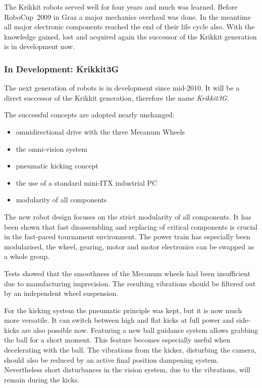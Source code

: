 \documentclass[12pt,a4paper]{article}
\begin{document}
The Krikkit robots served well for four years and much was learned.
Before RoboCup~2009 in Graz a major mechanics overhaul was done.
In the meantime all major electronic components reached the end of their life cycle also.
With the knowledge gained, lost and acquired again the successor of the Krikkit generation is in development now.
    

\subsubsection{In Development: Krikkit3G}

The next generation of robots is in development since mid-2010.
It will be a direct successor of the Krikkit generation, therefore the name \emph{Krikkit3G}.

The successful concepts are adopted nearly unchanged:\nopagebreak[4] %
\begin{itemize}
  \item omnidirectional drive with the three Mecanum Wheels
  \item the omni-vision system
  \item pneumatic kicking concept
  \item the use of a standard mini-ITX industrial PC
  \item modularity of all components
\end{itemize}

The new robot design focuses on the strict modularity of all components.
It has been shown that fast disassembling and replacing of critical components is crucial in the fast-paced tournament environment.
The power train has especially been modularised, the wheel, gearing, motor and motor electronics can be swapped as a whole group.

Tests showed that the smoothness of the Mecanum wheels had been insufficient due to manufacturing imprecision.
The resulting vibrations should be filtered out by an independent wheel suspension.


For the kicking system the pneumatic principle was kept, but it is now much more versatile. 
It can switch between high and flat kicks at full power and side-kicks are also possible now.
Featuring a new ball guidance system allows grabbing the ball for a short moment.
This feature becomes especially useful when decelerating with the ball.
The vibrations from the kicker, disturbing the camera, should also be reduced by an active final position dampening system.
Nevertheless short disturbances in the vision system, due to the vibrations, will remain during the kicks.
\end{document}
